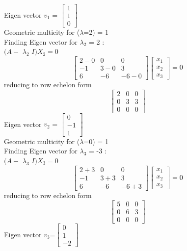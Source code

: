 \documentclass[12pt]{article}
\begin{document}
\begin{enumerate}[label=\alph*)]
\[\]
Eigen vector $v_{1}$ = $\begin{bmatrix} 1\\1\\0\end{bmatrix}$\\
Geometric multicity for ($\lambda$=2) = 1\\
Finding Eigen vector for $\lambda_{2}$ = 2 :\\
$(A-$ $\lambda_{2}$ $I)X_{2} = 0$
\[
\begin{bmatrix} 2-0 & 0 & 0\\-1 & 3-0 & 3\\6 & -6 & -6-0\end{bmatrix}\begin{bmatrix} x_{1}\\x_{2}\\x_{3}\end{bmatrix} = 0
\]
reducing to row echelon form
\[
\begin{bmatrix} 2 & 0 & 0\\0 & 3 & 3\\0 & 0 & 0\end{bmatrix}
\]
Eigen vector $v_{2}$ = $\begin{bmatrix} 0\\-1\\1\end{bmatrix}$\\
Geometric multicity for ($\lambda$=0) = 1\\
Finding Eigen vector for $\lambda_{3}$ = -3 :\\
$(A-$ $\lambda_{3}$ $I)X_{3} = 0$
\[
\begin{bmatrix} 2+3 & 0 & 0\\-1 & 3+3 & 3\\6 & -6 & -6+3\end{bmatrix}\begin{bmatrix} x_{1}\\x_{2}\\x_{3}\end{bmatrix} = 0
\]
reducing to row echelon form
\[
\begin{bmatrix}5 & 0 & 0\\0 & 6 & 3\\0 & 0 & 0\end{bmatrix}
\]
Eigen vector $v_{3}$=$\begin{bmatrix}0\\1\\-2\end{bmatrix}$\\

\end{enumerate}
\end{document}
